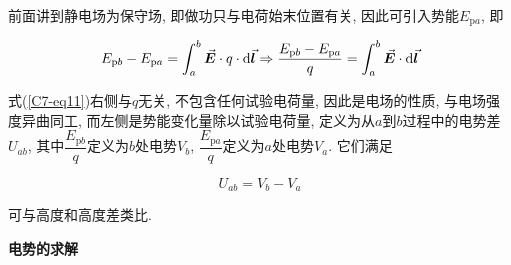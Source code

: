前面讲到静电场为保守场, 即做功只与电荷始末位置有关, 因此可引入势能$E_{\textrm{p}a}$, 即

\begin{equation}
	E_{\textrm{p}b} - E_{\textrm{p}a} = \int_{a}^{b}{\va*{E} \cdot q \cdot \dd{\va*{l}}} \Rightarrow \dfrac{E_{\textrm{p}b} - E_{\textrm{p}a}}{q}  = \int_{a}^{b}{\va*{E} \cdot \dd{\va*{l}}} \label{C7-eq11}
\end{equation}

式(\ref{C7-eq11})右侧与$q$无关, 不包含任何试验电荷量, 因此是电场的性质, 与电场强度异曲同工, 而左侧是势能变化量除以试验电荷量, 定义为从$a$到$b$过程中的电势差$U_{ab}$, 其中$\dfrac{E_{\textrm{p}b}}{q}$定义为$b$处电势$V_b$, $\dfrac{E_{\textrm{p}a}}{q}$定义为$a$处电势$V_a$. 它们满足

\begin{equation}
	U_{ab} = V_b - V_a
\end{equation}

可与高度和高度差类比. 

\textbf{电势的求解}

